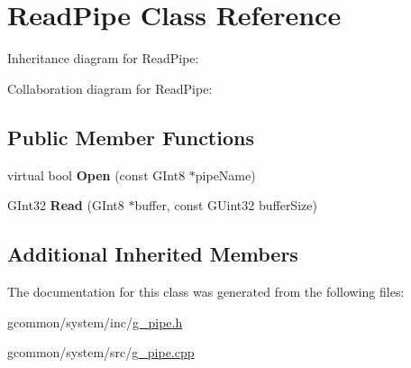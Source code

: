 \hypertarget{class_read_pipe}{\section{Read\-Pipe Class Reference}
\label{class_read_pipe}
}


Inheritance diagram for Read\-Pipe\-:


Collaboration diagram for Read\-Pipe\-:
\subsection*{Public Member Functions}
\begin{DoxyCompactItemize}
\item 
\hypertarget{class_read_pipe_ad7a55fb5526056bff78c1c81a43a4d2e}{virtual bool {\bfseries Open} (const G\-Int8 $\ast$pipe\-Name)}\label{class_read_pipe_ad7a55fb5526056bff78c1c81a43a4d2e}

\item 
\hypertarget{class_read_pipe_af9d3e7d572f66cc5f85d319add0cbef5}{G\-Int32 {\bfseries Read} (G\-Int8 $\ast$buffer, const G\-Uint32 buffer\-Size)}\label{class_read_pipe_af9d3e7d572f66cc5f85d319add0cbef5}

\end{DoxyCompactItemize}
\subsection*{Additional Inherited Members}


The documentation for this class was generated from the following files\-:\begin{DoxyCompactItemize}
\item 
gcommon/system/inc/\hyperlink{g__pipe_8h}{g\-\_\-pipe.\-h}\item 
gcommon/system/src/\hyperlink{g__pipe_8cpp}{g\-\_\-pipe.\-cpp}\end{DoxyCompactItemize}
